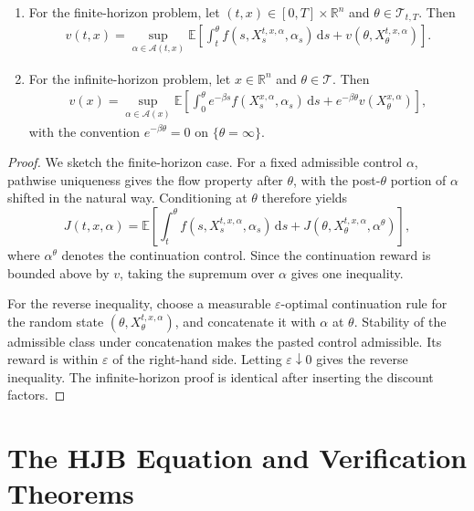 \begin{thm}
\begin{enumerate}[label=\textup{(\roman*)}]
\item For the finite-horizon problem, let \((t,x)\in[0,T]\times\mathbb R^n\) and \(\theta\in\mathcal T_{t,T}\). Then
\[
\begin{aligned}
v(t,x)
=\sup_{\alpha\in\mathcal A(t,x)}
\mathbb E\!\left[
\int_t^\theta
f(s,X_s^{t,x,\alpha},\alpha_s)\,\mathrm ds
+v(\theta,X_\theta^{t,x,\alpha})
\right].
\end{aligned}
\]

\item For the infinite-horizon problem, let \(x\in\mathbb R^n\) and \(\theta\in\mathcal T\). Then
\[
\begin{aligned}
v(x)
=\sup_{\alpha\in\mathcal A(x)}
\mathbb E\!\left[
\int_0^\theta e^{-\beta s}
 f(X_s^{x,\alpha},\alpha_s)\,\mathrm ds
+e^{-\beta\theta}v(X_\theta^{x,\alpha})
\right],
\end{aligned}
\]
with the convention \(e^{-\beta\theta}=0\) on \(\{\theta=\infty\}\).
\end{enumerate}
\end{thm}

\begin{proof}
We sketch the finite-horizon case. For a fixed admissible control \(\alpha\), pathwise uniqueness gives the flow property after \(\theta\), with the post-\(\theta\) portion of \(\alpha\) shifted in the natural way. Conditioning at \(\theta\) therefore yields
\[
J(t,x,\alpha)
=\mathbb E\!\left[
\int_t^\theta
f(s,X_s^{t,x,\alpha},\alpha_s)\,\mathrm ds
+J(\theta,X_\theta^{t,x,\alpha},\alpha^\theta)
\right],
\]
where \(\alpha^\theta\) denotes the continuation control. Since the continuation reward is bounded above by \(v\), taking the supremum over \(\alpha\) gives one inequality.

For the reverse inequality, choose a measurable \(\varepsilon\)-optimal continuation rule for the random state \((\theta,X_\theta^{t,x,\alpha})\), and concatenate it with \(\alpha\) at \(\theta\). Stability of the admissible class under concatenation makes the pasted control admissible. Its reward is within \(\varepsilon\) of the right-hand side. Letting \(\varepsilon\downarrow0\) gives the reverse inequality. The infinite-horizon proof is identical after inserting the discount factors.
\end{proof}

\section{The HJB Equation and Verification Theorems}

